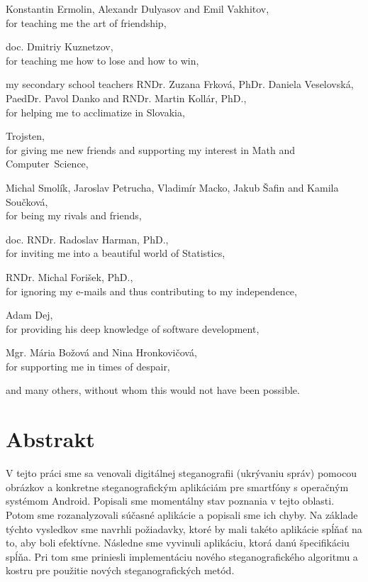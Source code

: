 \documentclass[12pt, oneside]{book}
\def\ack#1#2{#1,\\#2\smallskip}
\begin{document}
\ack{Konstantin Ermolin, Alexandr Dulyasov and Emil Vakhitov}{for teaching me the art of friendship,}

\ack{doc. Dmitriy Kuznetzov}{for teaching me how to lose and how to win,}

\ack{my secondary school teachers RNDr. Zuzana Frková, PhDr. Daniela Veselovská, PaedDr. Pavol Danko and RNDr. Martin Kollár, PhD.}
{for helping me to acclimatize in Slovakia,}

\ack{Trojsten}{for giving me new friends and supporting my interest in Math and Computer~Science,}

\ack{Michal Smolík, Jaroslav Petrucha, Vladimír Macko, Jakub Šafin and Kamila Součková}{for being
my rivals and friends,}

\ack{doc. RNDr. Radoslav Harman, PhD.}{for inviting me into a beautiful world of Statistics,}

\ack{RNDr. Michal Forišek, PhD.}{for ignoring my e-mails and thus contributing to my independence,}

\ack{Adam Dej}{for providing his deep knowledge of software development,}

\ack{Mgr. Mária Božová and Nina Hronkovičová}{for supporting me in times of despair,}

and many others, without whom this would not have been possible.

\vfill


\newpage 
\section*{Abstrakt}

V tejto práci sme sa venovali digitálnej steganografii (ukrývaniu správ) pomocou obrázkov 
a konkretne steganografickým aplikáciám pre smartfóny s operačným systémom Android. 
Popisali sme momentálny stav poznania v tejto oblasti. 
Potom sme rozanalyzovali súčasné aplikácie
a popisali sme ich chyby. Na základe týchto vysledkov sme navrhli 
požiadavky, ktoré by mali takéto aplikácie spĺňať na to, aby boli efektívne. Následne
sme vyvinuli aplikáciu, ktorá danú špecifikáciu spĺňa. 
Pri tom sme priniesli implementáciu nového steganografického algoritmu a kostru
pre použitie nových steganografických metód.
\end{document}
